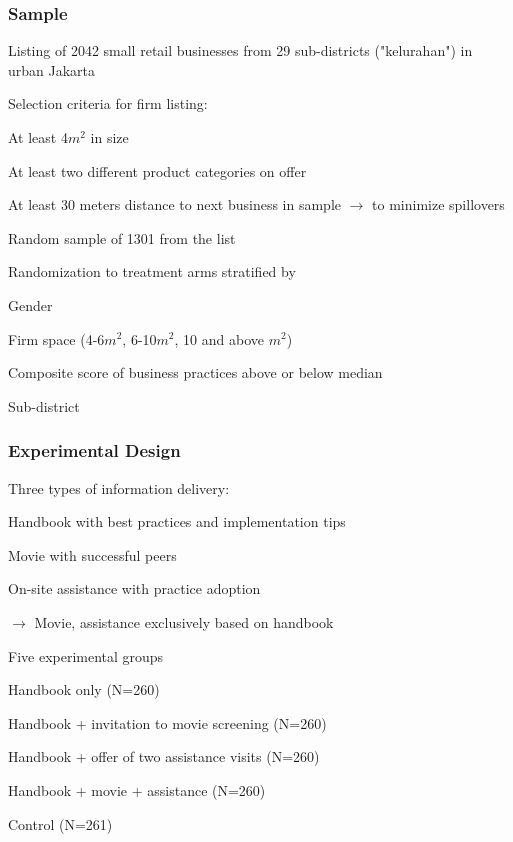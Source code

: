\documentclass[hideothersubsections, usenames,dvipsnames,11pt]{beamer}
\newenvironment{itemize_2pt}{\itemize\addtolength{\itemsep}{2pt}}{\enditemize}
\newenvironment{enumerate_2pt}{\enumerate\addtolength{\itemsep}{2pt}}{\endenumerate}
\begin{document}
\begin{frame}
\frametitle{Sample}
\begin{itemize_2pt}
\item Listing of 2042 small retail businesses from 29 sub-districts ("kelurahan") in urban Jakarta
\item Selection criteria for firm listing:
	\begin{itemize_2pt}
	\item At least 4$m^{2}$ in size
	\item At least two different product categories on offer
	\item At least 30 meters distance to next business in sample $\rightarrow$ to minimize spillovers
	\end{itemize_2pt}
\item Random sample of 1301 from the list
\item Randomization to treatment arms stratified by
	\begin{itemize_2pt}
	\item Gender
	\item Firm space (4-6$m^2$, 6-10$m^2$, 10 and above $m^2$)
	\item Composite score of business practices above or below median
	\item Sub-district
	\end{itemize_2pt}
\end{itemize_2pt}
\end{frame}


\begin{frame}
\frametitle{Experimental Design}

	Three types of information delivery:
		\begin{enumerate_2pt}
			\item \textcolor{bdf}{Handbook} with best practices and implementation tips
			\item \textcolor{bdf}{Movie} with successful peers
			\item \textcolor{bdf}{On-site assistance} with practice adoption
			\item[] $\rightarrow$ Movie, assistance exclusively based on handbook
		\end{enumerate_2pt}
	\vspace{0.1in}
	
	Five experimental groups
    	\begin{enumerate_2pt}
        	\item \textcolor{bdf}{Handbook} only (N=260)
        	\item \textcolor{bdf}{Handbook} + invitation to \textcolor{bdf}{movie} screening (N=260)
        	\item \textcolor{bdf}{Handbook} + offer of two \textcolor{bdf}{assistance} visits (N=260)
        	\item \textcolor{bdf}{Handbook} + \textcolor{bdf}{movie} + \textcolor{bdf}{assistance} (N=260)
       		\item Control (N=261)
      	\end{enumerate_2pt}
\end{frame}
\end{document}
